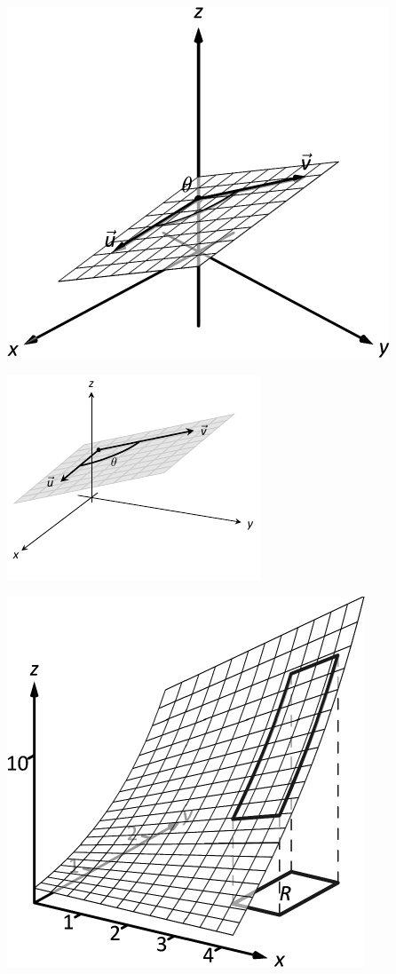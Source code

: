 \documentclass[10pt]{article}
\begin{document}
\includegraphics{figdotpangle3D_3DBW.pdf}
\texttt{}

\includegraphics{figdotpangle3DBW.pdf}
\texttt{}

\includegraphics{figdouble1_3DBW.pdf}
\texttt{}
\end{document}
